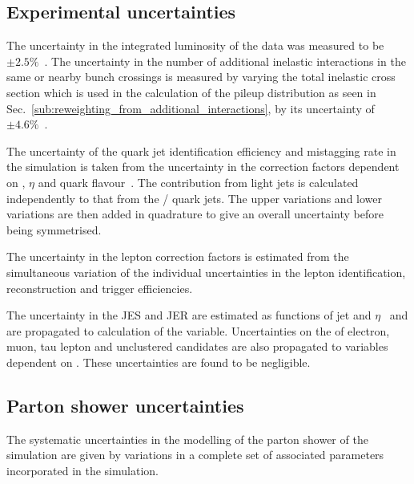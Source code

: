 \subsection{Experimental uncertainties} %
\label{sub:experimental_uncertainties}

The uncertainty in the integrated luminosity of the data was measured to be $\pm 2.5\%$~\cite{Sys:Lumi}.
The uncertainty in the number of additional inelastic interactions in the same or nearby bunch crossings is measured by varying the total inelastic cross section which is used in the calculation of the pileup distribution as seen in Sec.~\ref{sub:reweighting_from_additional_interactions}, by its uncertainty of $\pm 4.6\%$~\cite{Sys:PU}.

The uncertainty of the \bquark{} quark jet identification efficiency and mistagging rate in the simulation is taken from the uncertainty in the correction factors dependent on \pt{}, $\eta$ and quark flavour~\cite{Event:BTV}.
The contribution from light jets is calculated independently to that from the \bquark{}/\cquark{} quark jets.
The upper variations and lower variations are then added in quadrature to give an overall uncertainty before being symmetrised.

The uncertainty in the lepton correction factors is estimated from the simultaneous variation of the individual uncertainties in the lepton identification, reconstruction and trigger efficiencies.

The uncertainty in the JES and JER are estimated as functions of jet \pt{} and $\eta$~\cite{Event:JEC} and are propagated to calculation of the \ptmiss{} variable.
Uncertainties on the \pt{} of electron, muon, tau lepton and unclustered \PF{} candidates are also propagated to variables dependent on \ptmiss{}.
These uncertainties are found to be negligible.

\subsection{Parton shower uncertainties} %
\label{sub:parton_shower_uncertainties}

The systematic uncertainties in the modelling of the parton shower of the \ttbar{} simulation are given by variations in a complete set of associated parameters incorporated in the \powhegpythia{} simulation.

